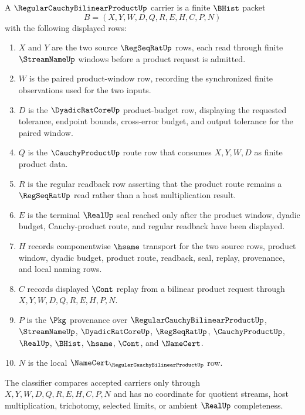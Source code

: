 \begin{definition}
\label{def:regular-cauchy-bilinear-product-carrier}
A $\RegularCauchyBilinearProductUp$ carrier is a finite $\BHist$ packet
$$
B=(X,Y,W,D,Q,R,E,H,C,P,N)
$$
with the following displayed rows:
\begin{enumerate}
\item $X$ and $Y$ are the two source $\RegSeqRatUp$ rows, each read through finite $\StreamNameUp$ windows before a product request is admitted.
\item $W$ is the paired product-window row, recording the synchronized finite observations used for the two inputs.
\item $D$ is the $\DyadicRatCoreUp$ product-budget row, displaying the requested tolerance, endpoint bounds, cross-error budget, and output tolerance for the paired window.
\item $Q$ is the $\CauchyProductUp$ route row that consumes $X,Y,W,D$ as finite product data.
\item $R$ is the regular readback row asserting that the product route remains a $\RegSeqRatUp$ read rather than a host multiplication result.
\item $E$ is the terminal $\RealUp$ seal reached only after the product window, dyadic budget, Cauchy-product route, and regular readback have been displayed.
\item $H$ records componentwise $\hsame$ transport for the two source rows, product window, dyadic budget, product route, readback, seal, replay, provenance, and local naming rows.
\item $C$ records displayed $\Cont$ replay from a bilinear product request through $X,Y,W,D,Q,R,E,H,P,N$.
\item $P$ is the $\Pkg$ provenance over $\RegularCauchyBilinearProductUp$, $\StreamNameUp$, $\DyadicRatCoreUp$, $\RegSeqRatUp$, $\CauchyProductUp$, $\RealUp$, $\BHist$, $\hsame$, $\Cont$, and $\NameCert$.
\item $N$ is the local $\NameCert_{\RegularCauchyBilinearProductUp}$ row.
\end{enumerate}
The classifier compares accepted carriers only through $X,Y,W,D,Q,R,E,H,C,P,N$ and has no coordinate for quotient streams, host multiplication, trichotomy, selected limits, or ambient $\RealUp$ completeness.
\end{definition}

